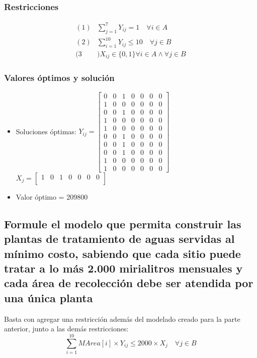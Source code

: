 \documentclass[a4paper,12pt]{article}
\begin{document}
\subsubsection{Restricciones}
\begin{equation*}
	\begin{split}
		(1)&\sum_{j=1}^{7}Y_{ij}=1\quad \forall i\in A\\
		(2)&\sum_{i=1}^{10}Y_{ij}\leq 10\quad \forall j\in B\\
		(3&)X_{ij}\in\{0,1\}\forall i\in A \wedge \forall j\in B
	\end{split}
\end{equation*}
\subsubsection{Valores óptimos y solución}
\begin{itemize}
	\item Soluciones óptimas: $Y_{ij}=
	\begin{bmatrix}
	0 & 0 & 1 & 0 & 0 & 0 & 0\\
	1 & 0 & 0 & 0 & 0 & 0 & 0\\
	0 & 0 & 1 & 0 & 0 & 0 & 0\\
	1 & 0 & 0 & 0 & 0 & 0 & 0\\
	1 & 0 & 0 & 0 & 0 & 0 & 0\\
	0 & 0 & 1 & 0 & 0 & 0 & 0\\
	0 & 0 & 1 & 0 & 0 & 0 & 0\\
	0 & 0 & 1 & 0 & 0 & 0 & 0\\
	1 & 0 & 0 & 0 & 0 & 0 & 0\\
	1 & 0 & 0 & 0 & 0 & 0 & 0
	\end{bmatrix}$\\
	
	$X_{j}=
	\begin{bmatrix}
	1 & 0 & 1 & 0 & 0 & 0 & 0\\
	\end{bmatrix}$
	\item Valor óptimo = 209800
\end{itemize}
\subsection{Formule  el  modelo  que  permita  construir  las  plantas  de  tratamiento  de  aguas  servidas  al  mínimo  costo, sabiendo que cada sitio puede  tratar a lo más 2.000 mirialitros mensuales y cada área de recolección debe ser atendida por una única planta}
Basta con agregar una restricción además del modelado creado para la parte anterior, junto a las demás restricciones:
\begin{equation*}
	\sum_{i=1}^{10}MArea[i]\times Y_{ij}\leq 2000\times X_j \quad \forall j \in B
\end{equation*}
\end{document}
